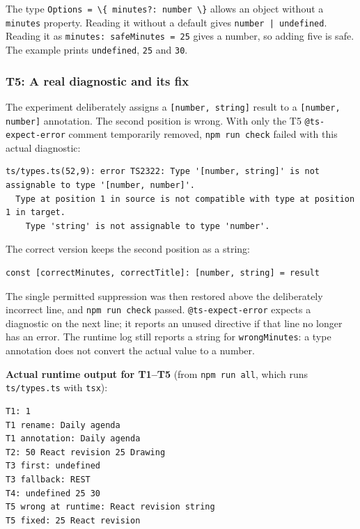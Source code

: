 \documentclass[
  11pt,
]{article}
\newcommand{\passthrough}[1]{#1}
\begin{document}
The type \passthrough{\lstinline!Options = \{ minutes?: number \}!}
allows an object without a \passthrough{\lstinline!minutes!} property.
Reading it without a default gives
\passthrough{\lstinline!number | undefined!}. Reading it as
\passthrough{\lstinline!minutes: safeMinutes = 25!} gives a number, so
adding five is safe. The example prints
\passthrough{\lstinline!undefined!}, \passthrough{\lstinline!25!} and
\passthrough{\lstinline!30!}.

\subsubsection{T5: A real diagnostic and its
fix}\label{t5-a-real-diagnostic-and-its-fix}

The experiment deliberately assigns a
\passthrough{\lstinline![number, string]!} result to a
\passthrough{\lstinline![number, number]!} annotation. The second
position is wrong. With only the T5
\passthrough{\lstinline!@ts-expect-error!} comment temporarily removed,
\passthrough{\lstinline!npm run check!} failed with this actual
diagnostic:

\begin{lstlisting}
ts/types.ts(52,9): error TS2322: Type '[number, string]' is not assignable to type '[number, number]'.
  Type at position 1 in source is not compatible with type at position 1 in target.
    Type 'string' is not assignable to type 'number'.
\end{lstlisting}

The correct version keeps the second position as a string:

\begin{lstlisting}
const [correctMinutes, correctTitle]: [number, string] = result
\end{lstlisting}

The single permitted suppression was then restored above the
deliberately incorrect line, and \passthrough{\lstinline!npm run check!}
passed. \passthrough{\lstinline!@ts-expect-error!} expects a diagnostic
on the next line; it reports an unused directive if that line no longer
has an error. The runtime log still reports a string for
\passthrough{\lstinline!wrongMinutes!}: a type annotation does not
convert the actual value to a number.

\textbf{Actual runtime output for T1--T5} (from
\passthrough{\lstinline!npm run all!}, which runs
\passthrough{\lstinline!ts/types.ts!} with
\passthrough{\lstinline!tsx!}):

\begin{lstlisting}
T1: 1
T1 rename: Daily agenda
T1 annotation: Daily agenda
T2: 50 React revision 25 Drawing
T3 first: undefined
T3 fallback: REST
T4: undefined 25 30
T5 wrong at runtime: React revision string
T5 fixed: 25 React revision
\end{lstlisting}
\end{document}
